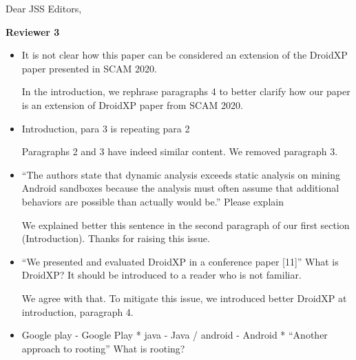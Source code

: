 \documentclass[12pt,english]{scrartcl}
\begin{document}
\begin{letter}{Dear JSS Editors,}
\begin{itemize}
\end{itemize}

{\bf Reviewer 3}

\begin{itemize}

\item It is not clear how this paper can be considered an extension of the DroidXP paper presented in SCAM 2020.


\vspace{0.2cm}

{\color{blue}{\bf Answer.} In the introduction, we rephrase paragraphs 4 to better clarify how our paper is an extension of DroidXP paper from SCAM 2020.}

\vspace{0.2cm}

\item Introduction, para 3 is repeating para 2


\vspace{0.2cm}

{\color{blue}{\bf Answer.} Paragraphs 2 and 3 have indeed similar content. We removed paragraph 3.}

\vspace{0.2cm}

\item ``The authors state that dynamic analysis exceeds static analysis on mining Android sandboxes because the
analysis must often assume that additional behaviors are possible than actually would be.''
Please explain


\vspace{0.2cm}

{\color{blue}{\bf Answer.} We explained better this sentence in the second paragraph of our
  first section (Introduction). Thanks for raising this issue.}

\vspace{0.2cm}

\item ``We presented and evaluated DroidXP in a conference paper [11]''
What is DroidXP? It should be introduced to a reader who is not familiar.


\vspace{0.2cm}

{\color{blue}{\bf Answer.} We agree with that. To mitigate this issue, we introduced better DroidXP at introduction, paragraph 4.}

\vspace{0.2cm}

\item Google play - Google Play
* java - Java / android - Android
* ``Another approach to rooting''
What is rooting?



\end{itemize}
\end{letter}
\end{document}
